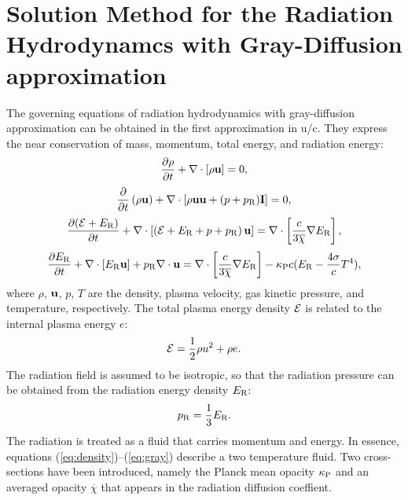 \documentclass[12pt]{article}
\newcommand{\Erad}{E_{\rm R}}
\newcommand{\prad}{p_{\rm R}}
\newcommand{\kappaP}{\kappa_{\rm P}}
\begin{document}
\section{Solution Method for the Radiation Hydrodynamcs with Gray-Diffusion approximation}  
The governing equations of radiation hydrodynamics with gray-diffusion 
approximation can be obtained in the first approximation in u/c. They 
express the near conservation of mass, momentum, total energy, and 
radiation energy: 
\begin{equation}\label{eq:density} \frac{\partial\rho}{\partial t} +
\nabla\cdot\left[ \rho {\bf u} \right] = 0, 
\end{equation} 
\begin{equation}   \frac{\partial}{\partial t}\left( \rho {\bf u} \right) +
 \nabla\cdot\left[ \rho{\bf u}{\bf u}     +(p+\prad){\bf I} \right] = 0, 
\end{equation} 
\begin{equation}   \frac{\partial ({\cal E} + \Erad)}{\partial t} + 
\nabla\cdot   \left[ \left( {\cal E} + \Erad+ p+\prad \right) {\bf u} 
\right]   = \nabla\cdot\left[ \frac{c}{ 3 \overline{\chi} } \nabla \Erad 
\right], 
\end{equation}\label{eq:energy} 
\begin{equation}\label{eq:gray}   \frac{\partial \Erad}{\partial t} + 
\nabla\cdot \left[ \Erad {\bf u} \right]   + \prad\nabla\cdot{\bf u} 
=    \nabla\cdot\left[ \frac{c}{ 3\overline{\chi} } \nabla \Erad \right]   
-\kappaP c (\Erad - \frac{4\sigma}{c} T^4), 
\end{equation} 
where $\rho$, ${\bf u}$, $p$, $T$ are the density, plasma velocity, gas 
kinetic pressure, and temperature, respectively. The total plasma energy 
density ${\cal E}$ is related to the internal plasma energy $e$: 
\begin{equation} 
{\cal E} = \frac{1}{2}\rho u^2 + \rho e. 
\end{equation} 
The radiation field is assumed to be isotropic, so that the radiation 
pressure can be obtained from the radiation energy density $\Erad$: 
\begin{equation} 
\prad = \frac{1}{3}\Erad. 
\end{equation} 
The radiation is treated as a fluid that carries momentum and energy. 
In essence, equations (\ref{eq:density})--(\ref{eq:gray}) describe a two 
temperature fluid. Two cross-sections have been introduced, namely the 
Planck mean opacity $\kappa_{\rm P}$ and an averaged opacity 
$\overline{\chi}$ that appears in the radiation diffusion coeffient.  
\end{document}
